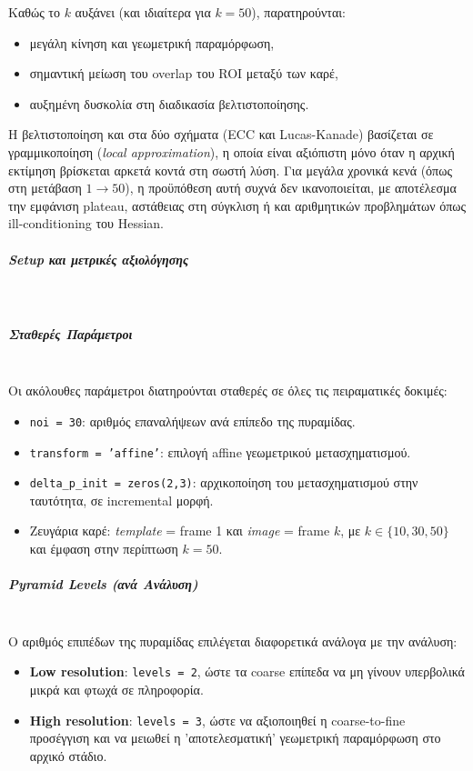 \documentclass[12pt]{article}
\begin{document}
Καθώς το \(k\) αυξάνει (και ιδιαίτερα για \(k = 50\)), παρατηρούνται:
\begin{itemize}
    \item μεγάλη κίνηση και γεωμετρική παραμόρφωση,
    \item σημαντική μείωση του overlap του ROI μεταξύ των καρέ,
    \item αυξημένη δυσκολία στη διαδικασία βελτιστοποίησης.
\end{itemize}

Η βελτιστοποίηση και στα δύο σχήματα (ECC και Lucas-Kanade) βασίζεται σε γραμμικοποίηση (\textit{local approximation}), η οποία είναι αξιόπιστη μόνο όταν η αρχική εκτίμηση βρίσκεται αρκετά κοντά στη σωστή λύση. Για μεγάλα χρονικά κενά (όπως στη μετάβαση \(1 \rightarrow 50\)), η προϋπόθεση αυτή συχνά δεν ικανοποιείται, με αποτέλεσμα την εμφάνιση plateau, αστάθειας στη σύγκλιση ή και αριθμητικών προβλημάτων όπως ill-conditioning του Hessian.



\subparagraph{Setup και μετρικές αξιολόγησης}
\mbox{}\\
\subparagraph{Σταθερές Παράμετροι}
\mbox{}\\
Οι ακόλουθες παράμετροι διατηρούνται σταθερές σε όλες τις πειραματικές δοκιμές:
\begin{itemize}
    \item \texttt{noi = 30}: αριθμός επαναλήψεων ανά επίπεδο της πυραμίδας.
    \item \texttt{transform = 'affine'}: επιλογή affine γεωμετρικού μετασχηματισμού.
    \item \texttt{delta\_p\_init = zeros(2,3)}: αρχικοποίηση του μετασχηματισμού στην ταυτότητα, σε incremental μορφή.
    \item Ζευγάρια καρέ: \textit{template} = frame 1 και \textit{image} = frame \(k\), με \(k \in \{10, 30, 50\}\) και έμφαση στην περίπτωση \(k = 50\).
\end{itemize}

\subparagraph{Pyramid Levels (ανά Ανάλυση)}
\mbox{}\\
Ο αριθμός επιπέδων της πυραμίδας επιλέγεται διαφορετικά ανάλογα με την ανάλυση:
\begin{itemize}
    \item \textbf{Low resolution}: \texttt{levels = 2}, ώστε τα coarse επίπεδα να μη γίνουν υπερβολικά μικρά και φτωχά σε πληροφορία.
    \item \textbf{High resolution}: \texttt{levels = 3}, ώστε να αξιοποιηθεί η coarse-to-fine προσέγγιση και να μειωθεί η 'αποτελεσματική' γεωμετρική παραμόρφωση στο αρχικό στάδιο.
\end{itemize}
\end{document}
